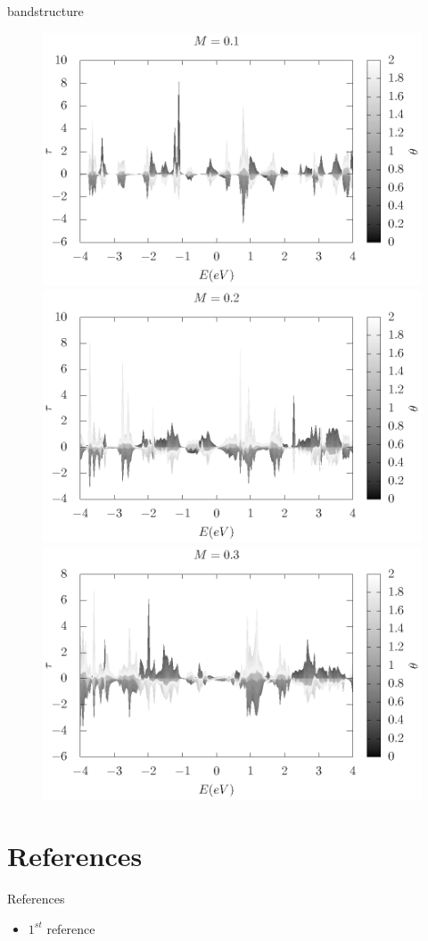 \documentclass[handout,t]{beamer}
\begin{document}
\begin{frame}{bandstructure}
	\begin{figure}[ht]
		\centering
		\includegraphics[width=0.33\linewidth]{../figures/stt-energy3d-01-thesis.eps}
		\includegraphics[width=0.33\linewidth]{../figures/stt-energy3d-02-thesis.eps}
		\includegraphics[width=0.33\linewidth]{../figures/stt-energy3d-03-thesis.eps}
	  \end{figure}
\end{frame}


\section{References}
\begin{frame}{References}
\begin{itemize}
\item $1^{st}$ reference
\end{itemize}
\end{frame}
\end{document}
